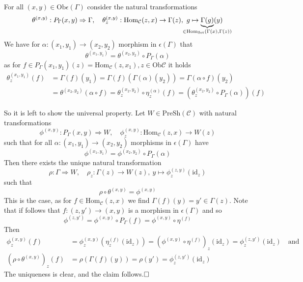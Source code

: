 For all $(x, y) \in \mathrm{Ob}\epsilon(\Gamma)$ consider the natural transformations
\begin{align*}
    \theta^{(x, y)}: P_\Gamma(x, y) \Rightarrow \Gamma, \quad \theta^{(x, y)}_z: \mathrm{Hom}_{\mathcal{C}}(z, x) \to \Gamma(z), \ g \mapsto \underbrace{\Gamma(g)}_{\mathclap{\in \mathrm{Hom}_{\mathrm{Set}}(\Gamma(x), \Gamma(z))}}(y)
\end{align*}
We have for $\alpha: (x_1, y_1) \to (x_2, y_2)$ morphism in $\epsilon(\Gamma)$ that
\begin{equation*}
    \theta^{(x_1, y_1)} = \theta^{(x_2, y_2)} \circ P_\Gamma(\alpha)
\end{equation*}
as for $f \in P_\Gamma(x_1, y_1)(z) = \mathrm{Hom}_{\mathcal{C}}(z, x_1), z \in \mathrm{Ob}\mathcal{C}$ it holds
\begin{align*}
    \theta^{(x_1, y_1)}_z(f) &= \Gamma(f)(y_1) = \Gamma(f)(\Gamma(\alpha)(y_2)) = \Gamma(\alpha \circ f)(y_2) \\
    &= \theta^{(x_2, y_2)}(\alpha \circ f) = \theta^{(x_2, y_2)}_z \circ \eta^{(\alpha)}_z(f) = (\theta^{(x_2, y_2)}_z \circ P_\Gamma(\alpha))(f)
\end{align*} 

So it is left to show the universal property. Let $W \in \mathrm{PreSh}(\mathcal{C})$ with natural transformations
\begin{equation*}
    \phi^{(x, y)}: P_\Gamma(x, y) \Rightarrow W, \quad \phi^{(x, y)}_z: \mathrm{Hom}_{\mathcal{C}}(z, x) \to W(z)
\end{equation*}
such that for all $\alpha: (x_1, y_1) \to (x_2, y_2)$ morphisms in $\epsilon(\Gamma)$ have
\begin{equation*}
    \phi^{(x_1, y_1)} = \phi^{(x_2, y_2)} \circ P_\Gamma(\alpha)
\end{equation*}
Then there exists the unique natural transformation
\begin{equation*}
    \rho: \Gamma \Rightarrow W, \quad \rho_z: \Gamma(z) \to W(z), \ y \mapsto \phi^{(z, y)}_z(\mathrm{id}_z)
\end{equation*}
such that
\begin{equation*}
    \rho \circ \theta^{(x, y)} = \phi^{(x, y)}
\end{equation*}
This is the case, as for $f \in \mathrm{Hom}_{\mathcal{C}}(z, x)$ we find $\Gamma(f)(y) = y' \in \Gamma(z)$.
Note that if follows that $f: (z, y') \to (x, y)$ is a morphism in $\epsilon(\Gamma)$ and so
\begin{equation*}
    \phi^{(z, y')} = \phi^{(x, y)} \circ P_\Gamma(f) = \phi^{(x, y)} \circ \eta^{(f)}
\end{equation*}
Then
\begin{align*}
    \phi^{(x, y)}_z(f) &= \phi^{(x,y)}_z(\eta^{(f)}_z(\mathrm{id}_z)) = (\phi^{(x, y)} \circ \eta^{(f)})_z(\mathrm{id}_z) = \phi^{(z, y')}_z(\mathrm{id}_z) \quad \text{and} \\
    (\rho \circ \theta^{(x, y)})_z(f) &= \rho(\Gamma(f)(y)) = \rho(y') = \phi_z^{(z, y')}(\mathrm{id}_z)
\end{align*}
The uniqueness is clear, and the claim follows.$\hfill\square$

